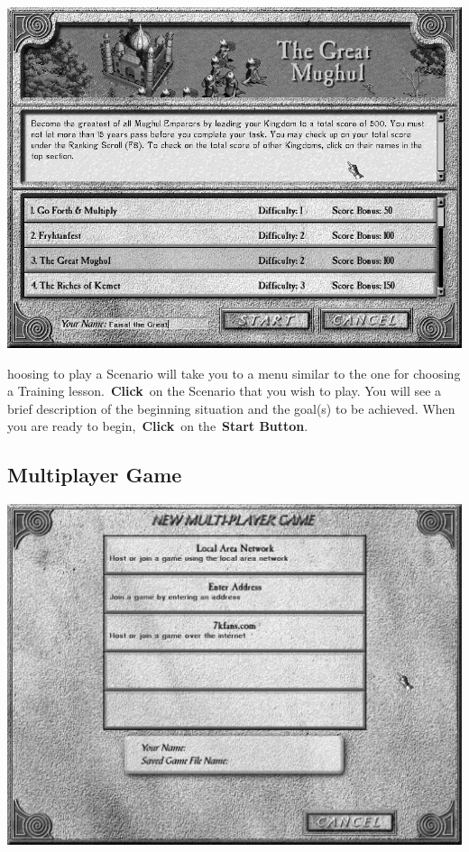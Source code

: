 \begin{center}
	\includegraphics[width=0.9\linewidth]{Iscenario} %
\end{center}

hoosing to play a Scenario will take you to a menu similar to the one for choosing a Training lesson. \textbf{Click} on the Scenario that you wish to play. You will see a brief description of the beginning situation and the goal(s) to be achieved. When you are ready to begin, \textbf{Click} on the \textbf{Start Button}.

\subsection{Multiplayer Game}


\begin{center}
	\includegraphics[width=0.9\linewidth]{Imultiplayer}
\end{center}

